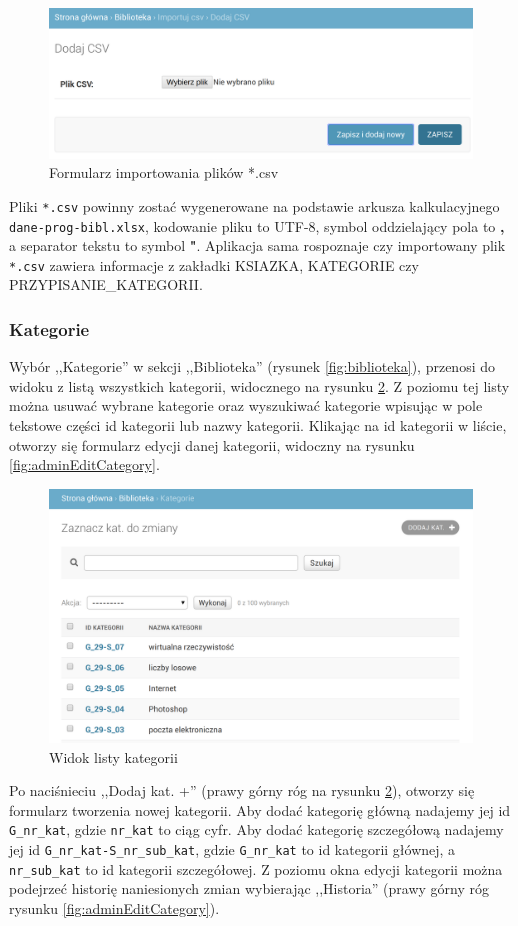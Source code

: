 \documentclass[twoside]{projektInzynierskiMS}
\begin{document}
\begin{figure}[h]
  \centering
  \includegraphics[width=0.6\linewidth]{img/backend/ImportCSV.png}
  \caption{Formularz importowania plików *.csv}
  \label{fig:importCSV}
\end{figure}


Pliki \verb`*.csv` powinny zostać wygenerowane na podstawie arkusza kalkulacyjnego \verb`dane-prog-bibl.xlsx`, kodowanie pliku to UTF-8, symbol oddzielający pola to \textbf{,} a separator tekstu to symbol \textbf{"}. Aplikacja sama rospoznaje czy importowany plik \verb`*.csv` zawiera informacje z zakładki KSIAZKA, KATEGORIE czy PRZYPISANIE\_KATEGORII.

\subsubsection{Kategorie}

Wybór ,,Kategorie'' w sekcji ,,Biblioteka'' (rysunek \ref{fig:biblioteka}), przenosi do widoku z listą wszystkich kategorii, widocznego na rysunku \ref{fig:adminAllCategories}. Z poziomu tej listy można usuwać wybrane kategorie oraz wyszukiwać kategorie wpisując w pole tekstowe części id kategorii lub nazwy kategorii. Klikając na id kategorii w liście, otworzy się formularz edycji danej kategorii, widoczny na rysunku \ref{fig:adminEditCategory}. 

\begin{figure}[h]
  \centering
  \includegraphics[width=0.6\linewidth]{img/backend/ListaKategorii.png}
  \caption{Widok listy kategorii}
  \label{fig:adminAllCategories}
\end{figure}

Po naciśnieciu ,,Dodaj kat. +'' (prawy górny róg na rysunku \ref{fig:adminAllCategories}), otworzy się formularz tworzenia nowej kategorii. Aby dodać kategorię główną nadajemy jej id \verb`G_nr_kat`, gdzie \verb`nr_kat` to ciąg cyfr. Aby dodać kategorię szczegółową nadajemy jej id \verb`G_nr_kat-S_nr_sub_kat`, gdzie \verb`G_nr_kat` to id kategorii głównej, a \verb`nr_sub_kat` to id kategorii szczegółowej.
Z poziomu okna edycji kategorii można podejrzeć historię naniesionych zmian wybierając ,,Historia'' (prawy górny róg rysunku \ref{fig:adminEditCategory}).
\end{document}
